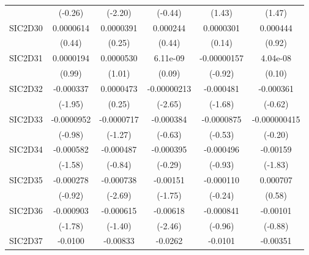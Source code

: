\begin{table}[htbp]
\begin{tabular}{l*{5}{c}}
            &     (-0.26)         &     (-2.20)         &     (-0.44)         &      (1.43)         &      (1.47)         \\
SIC2D30     &   0.0000614         &   0.0000391         &    0.000244         &   0.0000301         &    0.000444         \\
            &      (0.44)         &      (0.25)         &      (0.44)         &      (0.14)         &      (0.92)         \\
SIC2D31     &   0.0000194         &   0.0000530         &    6.11e-09         & -0.00000157         &    4.04e-08         \\
            &      (0.99)         &      (1.01)         &      (0.09)         &     (-0.92)         &      (0.10)         \\
SIC2D32     &   -0.000337         &   0.0000473         & -0.00000213\sym{**} &   -0.000481         &   -0.000361         \\
            &     (-1.95)         &      (0.25)         &     (-2.65)         &     (-1.68)         &     (-0.62)         \\
SIC2D33     &  -0.0000952         &  -0.0000717         &   -0.000384         &  -0.0000875         &-0.000000415         \\
            &     (-0.98)         &     (-1.27)         &     (-0.63)         &     (-0.53)         &     (-0.20)         \\
SIC2D34     &   -0.000582         &   -0.000487         &   -0.000395         &   -0.000496         &    -0.00159         \\
            &     (-1.58)         &     (-0.84)         &     (-0.29)         &     (-0.93)         &     (-1.83)         \\
SIC2D35     &   -0.000278         &   -0.000738\sym{**} &    -0.00151         &   -0.000110         &    0.000707         \\
            &     (-0.92)         &     (-2.69)         &     (-1.75)         &     (-0.24)         &      (0.58)         \\
SIC2D36     &   -0.000903         &   -0.000615         &    -0.00618\sym{*}  &   -0.000841         &    -0.00101         \\
            &     (-1.78)         &     (-1.40)         &     (-2.46)         &     (-0.96)         &     (-0.88)         \\
SIC2D37     &     -0.0100\sym{***}&    -0.00833\sym{*}  &     -0.0262\sym{***}&     -0.0101\sym{*}  &    -0.00351         \\

\end{tabular}
\end{table}
